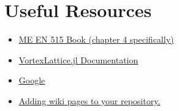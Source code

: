 \documentclass[12pt]{article}
\begin{document}
\section{Useful Resources}

\begin{itemize}
	\item \href{https://byu.box.com/shared/static/ywfayozbj3sr2ot6b32u8nqk5brqvurt.pdf}{ME EN 515 Book (chapter 4 specifically)}
	\item \href{https://flow.byu.edu/VortexLattice.jl/stable/}{VortexLattice.jl Documentation}
	\item \href{https://letmegooglethat.com/?q=what+is+the+vertical+tail+volume+ratio+formula}{Google}
	\item \href{https://docs.github.com/en/communities/documenting-your-project-with-wikis/adding-or-editing-wiki-pages}{Adding wiki pages to your repository.}
\end{itemize}
\end{document}
